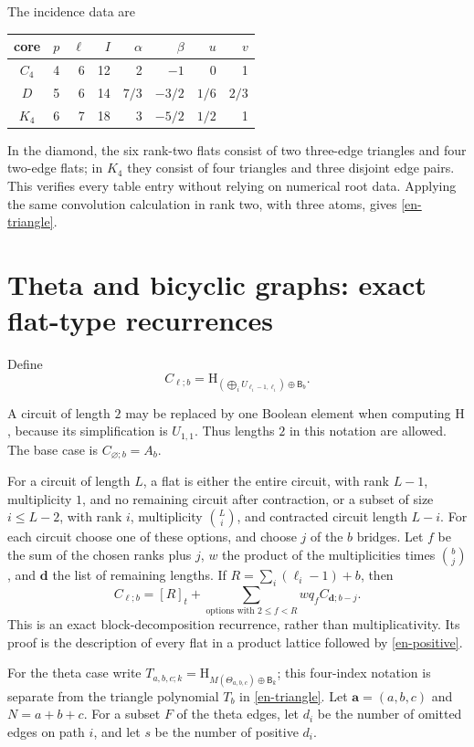 \documentclass[12pt]{amsart}
\theoremstyle{definition}
\theoremstyle{remark}
\numberwithin{equation}{section}
\newcommand{\HCh}{\mathrm{H}}
\newcommand{\Bmat}{\mathsf{B}}
\begin{document}
The incidence data are
\begin{center}
\begin{tabular}{c|rrr|rrrr}
core&$p$&$\ell$&$I$&$\alpha$&$\beta$&$u$&$v$\\\hline
$C_4$&4&6&12&2&$-1$&0&1\\
$D$&5&6&14&$7/3$&$-3/2$&$1/6$&$2/3$\\
$K_4$&6&7&18&3&$-5/2$&$1/2$&1
\end{tabular}
\end{center}
In the diamond, the six rank-two flats consist of two three-edge triangles and four two-edge flats; in $K_4$ they consist of four triangles and three disjoint edge pairs. This verifies every table entry without relying on numerical root data. Applying the same convolution calculation in rank two, with three atoms, gives \eqref{en-triangle}.

\section{Theta and bicyclic graphs: exact flat-type recurrences}
\begin{samepage}
Define
\[
 C_{\boldsymbol\ell;b}=\HCh_{(\bigoplus_iU_{\ell_i-1,\ell_i})\oplus\Bmat_b}.
\]
\end{samepage}
A circuit of length $2$ may be replaced by one Boolean element when computing $\HCh$, because its simplification is $U_{1,1}$. Thus lengths $2$ in this notation are allowed. The base case is $C_{\varnothing;b}=A_b$.

For a circuit of length $L$, a flat is either the entire circuit, with rank $L-1$, multiplicity $1$, and no remaining circuit after contraction, or a subset of size $i\leq L-2$, with rank $i$, multiplicity $\binom Li$, and contracted circuit length $L-i$. For each circuit choose one of these options, and choose $j$ of the $b$ bridges. Let $f$ be the sum of the chosen ranks plus $j$, $w$ the product of the multiplicities times $\binom bj$, and $\boldsymbol d$ the list of remaining lengths. If $R=\sum_i(\ell_i-1)+b$, then
\begin{equation}\label{en-cactus-recurrence}
 C_{\boldsymbol\ell;b}=[R]_t+
       \sum_{\text{options with }2\leq f<R}wq_f C_{\boldsymbol d;b-j}.
\end{equation}
This is an exact block-decomposition recurrence, rather than multiplicativity. Its proof is the description of every flat in a product lattice followed by \eqref{en-positive}.

For the theta case write $T_{a,b,c;k}=\HCh_{M(\Theta_{a,b,c})\oplus\Bmat_k}$; this four-index notation is separate from the triangle polynomial $T_b$ in \eqref{en-triangle}. Let $\boldsymbol a=(a,b,c)$ and $N=a+b+c$. For a subset $F$ of the theta edges, let $d_i$ be the number of omitted edges on path $i$, and let $s$ be the number of positive $d_i$.
\end{document}
